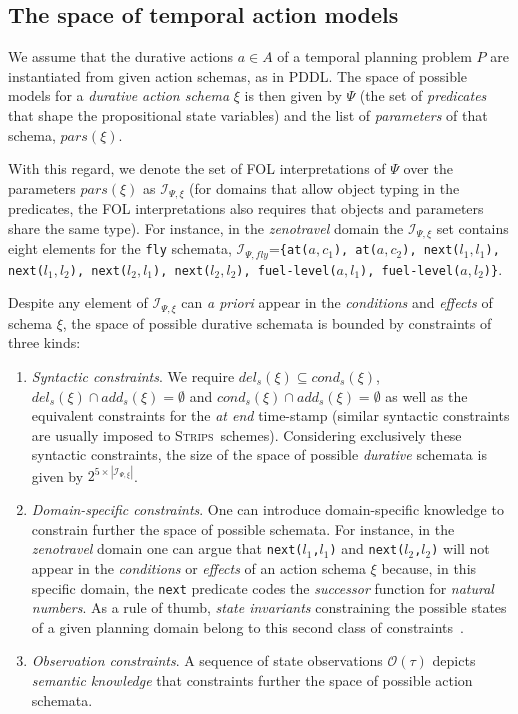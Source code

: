 \documentclass[letterpaper]{article} %
\newcommand{\strips}{\textsc{Strips}}     %
\begin{document}
\subsection{The space of temporal action models}
We assume that the durative actions $a\in A$ of a temporal planning problem $P$ are instantiated from given action schemas, as in PDDL. The space of possible models for a {\em durative action schema} $\xi$ is then given by $\Psi$ (the set of {\em predicates} that shape the propositional state variables) and the list of {\em parameters} of that schema, $pars(\xi)$.

With this regard, we denote the set of FOL interpretations of $\Psi$ over the parameters $pars(\xi)$ as ${\mathcal I}_{\Psi,\xi}$ (for domains that allow object typing in the predicates, the FOL interpretations also requires that objects and parameters share the same type). For instance, in the {\em zenotravel} domain the ${\mathcal I}_{\Psi,\xi}$ set contains eight elements for the {\small\tt fly} schemata, ${\mathcal I}_{\Psi,fly}$={\small\tt\{at($a,c_1$), at($a,c_2$), next($l_1,l_1$), next($l_1,l_2$), next($l_2,l_1$), next($l_2,l_2$), fuel-level($a,l_1$), fuel-level($a,l_2$)\}}.

Despite any element of ${\mathcal I}_{\Psi,\xi}$ can {\em a priori} appear in the {\em conditions} and {\em effects} of schema $\xi$, the space of possible durative schemata is bounded by constraints of three kinds:
\begin{enumerate}
\item {\em Syntactic constraints}. We require $del_s(\xi)\subseteq cond_s(\xi)$, $del_s(\xi)\cap add_s(\xi)=\emptyset$ and $cond_s(\xi)\cap add_s(\xi)=\emptyset$ as well as the equivalent constraints for the {\em at end} time-stamp (similar syntactic constraints are usually imposed to \strips\ schemes). Considering exclusively these syntactic constraints, the size of the space of possible {\em durative} schemata is given by $2^{5\times|{\mathcal I}_{\Psi,\xi}|}$.
\item {\em Domain-specific constraints}. One can introduce domain-specific knowledge to constrain further the space of possible schemata. For instance, in the {\em zenotravel} domain one can argue that {\small\tt next($l_1$,$l_1$)} and {\small\tt next($l_2$,$l_2$)} will not appear in the {\em conditions} or {\em effects} of an action schema $\xi$ because, in this specific domain, the {\tt\small next} predicate codes the {\em successor} function for {\em natural numbers}. As a rule of thumb, {\it state invariants} constraining the possible states of a given planning domain belong to this second class of constraints~\cite{fox:TIM:JAIR1998}.

\item {\em Observation constraints}. A sequence of state observations $\mathcal{O}(\tau)$ depicts {\em semantic knowledge} that constraints further the space of possible action schemata.
\end{enumerate}
\end{document}
